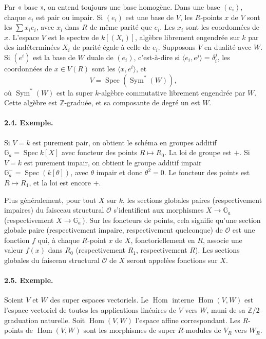 \documentclass[11pt]{article}
\newcommand{\Z}{\mathbb Z}
\newcommand{\Spec}{\operatorname{Spec}}
\newcommand{\Hom}{\operatorname{Hom}}
\newcommand{\Sym}{\operatorname{Sym}}
\newcommand{\Ga}{\mathbb G_a}
\newcommand{\calO}{\mathcal O}
\begin{document}
Par « base », on entend toujours une base homogène. Dans une base $(e_i)$, chaque $e_i$ est pair ou impair. Si $(e_i)$ est une base de $V$, les $R$-points $x$ de $V$ sont les $\sum x_i e_i$, avec $x_i$ dans $R$ de même parité que $e_i$. Les $x_i$ sont les coordonnées de $x$. L'espace $V$ est le spectre de $k[(X_i)]$, algèbre librement engendrée sur $k$ par des indéterminées $X_i$ de parité égale à celle de $e_i$. Supposons $V$ en dualité avec $W$. Si $(e^i)$ est la base de $W$ duale de $(e_i)$, c'est-à-dire si $\langle e_i,e^j\rangle=\delta_i^j$, les coordonnées de $x\in V(R)$ sont les $\langle x,e^i\rangle$, et
\[
V=\Spec(\Sym^*(W)),
\]
où $\Sym^*(W)$ est la super $k$-algèbre commutative librement engendrée par $W$. Cette algèbre est $\Z$-graduée, et sa composante de degré un est $W$.

\paragraph{2.4. Exemple.}
Si $V=k$ est purement pair, on obtient le schéma en groupes additif $\Ga=\Spec k[X]$ avec foncteur des points $R\mapsto R_0$. La loi de groupe est $+$. Si $V=k$ est purement impair, on obtient le groupe additif impair $\Ga^- =\Spec(k[\theta])$, avec $\theta$ impair et donc $\theta^2=0$. Le foncteur des points est $R\mapsto R_1$, et la loi est encore $+$.

Plus généralement, pour tout $X$ sur $k$, les sections globales paires (respectivement impaires) du faisceau structural $\calO$ s'identifient aux morphismes $X\to\Ga$ (respectivement $X\to\Ga^-$). Sur les foncteurs de points, cela signifie qu'une section globale paire (respectivement impaire, respectivement quelconque) de $\calO$ est une fonction $f$ qui, à chaque $R$-point $x$ de $X$, fonctoriellement en $R$, associe une valeur $f(x)$ dans $R_0$ (respectivement $R_1$, respectivement $R$). Les sections globales du faisceau structural $\calO$ de $X$ seront appelées fonctions sur $X$.

\paragraph{2.5. Exemple.}
Soient $V$ et $W$ des super espaces vectoriels. Le $\Hom$ interne $\Hom(V,W)$ est l'espace vectoriel de toutes les applications linéaires de $V$ vers $W$, muni de sa $\Z/2$-graduation naturelle. Soit $\Hom(V,W)$ l'espace affine correspondant. Les $R$-points de $\Hom(V,W)$ sont les morphismes de super $R$-modules de $V_R$ vers $W_R$.
\end{document}
